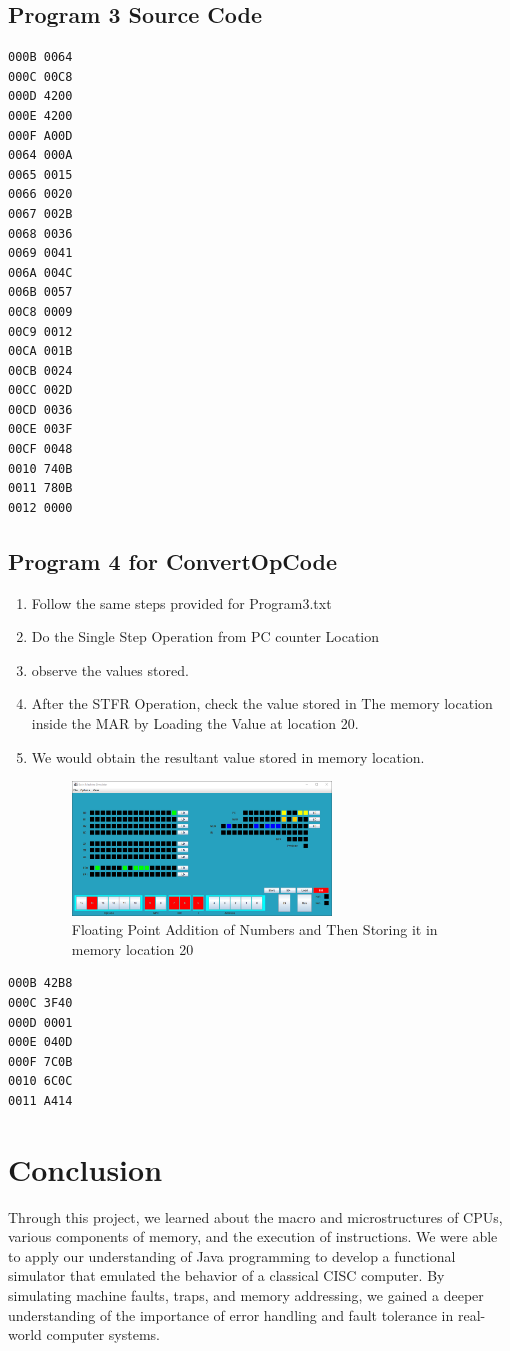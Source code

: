 \documentclass[10pt]{article}
\begin{document}
\subsection{Program 3 Source Code}
\begin{lstlisting}[caption={Program 3 Source Code}]
000B 0064
000C 00C8
000D 4200
000E 4200
000F A00D
0064 000A
0065 0015
0066 0020
0067 002B
0068 0036
0069 0041
006A 004C
006B 0057
00C8 0009
00C9 0012
00CA 001B
00CB 0024
00CC 002D
00CD 0036
00CE 003F
00CF 0048
0010 740B
0011 780B
0012 0000
\end{lstlisting}
\subsection{Program 4 for ConvertOpCode}
\begin{enumerate}
  \item Follow the same steps provided for Program3.txt
  \item Do the Single Step Operation from PC counter Location 
  \item observe the values stored.
  \item After the STFR Operation, check the value stored in The memory location  inside the MAR by Loading the Value at location 20.
  \item We would obtain the resultant value stored in memory location.
  \begin{figure}[H]
    \centering
    \includegraphics[width=0.65\textwidth]{Pics/FADDSTFR.png}
    \caption{Floating Point Addition of Numbers and Then Storing it in memory location 20}
    \label{fig:FADDSTFR}
  \end{figure}
\end{enumerate}
\begin{lstlisting}[caption={Program 4 Source Code}]
000B 42B8
000C 3F40
000D 0001
000E 040D
000F 7C0B
0010 6C0C
0011 A414
\end{lstlisting}
\section{Conclusion}
Through this project, we learned about the macro and microstructures of CPUs, various 
components of memory, and the execution of instructions. We were able to apply our understanding 
of Java programming to develop a functional simulator that emulated the behavior of a classical 
CISC computer. By simulating machine faults, traps, and memory addressing, we gained a deeper 
understanding of the importance of error handling and fault tolerance in real-world computer systems.
\end{document}
